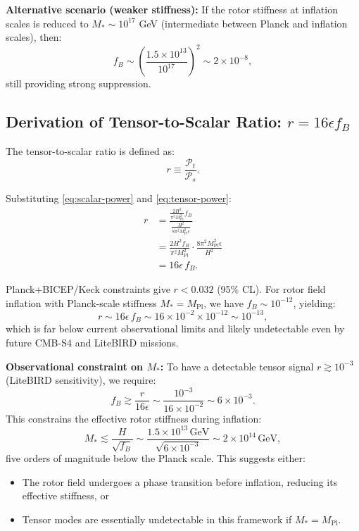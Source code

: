 \documentclass[11pt,a4paper]{article}
\numberwithin{equation}{section}
\theoremstyle{plain}
\theoremstyle{definition}
\theoremstyle{remark}
\begin{document}
\textbf{Alternative scenario (weaker stiffness):} If the rotor stiffness at inflation scales is reduced to $M_* \sim 10^{17}$ GeV (intermediate between Planck and inflation scales), then:
\begin{equation}
f_B \sim \left(\frac{1.5 \times 10^{13}}{10^{17}}\right)^2 \sim 2 \times 10^{-8},
\end{equation}
still providing strong suppression.

\subsection{Derivation of Tensor-to-Scalar Ratio: $r = 16\epsilon f_B$}

The tensor-to-scalar ratio is defined as:
\begin{equation}
r \equiv \frac{\mathcal{P}_t}{\mathcal{P}_s}.
\label{eq:r-def}
\end{equation}

Substituting \eqref{eq:scalar-power} and \eqref{eq:tensor-power}:
\begin{align}
r &= \frac{\frac{2H^2}{\pi^2 M_{\mathrm{Pl}}^2}f_B}{\frac{H^2}{8\pi^2 M_{\mathrm{Pl}}^2\epsilon}}\\
&= \frac{2H^2 f_B}{\pi^2 M_{\mathrm{Pl}}^2}\cdot\frac{8\pi^2 M_{\mathrm{Pl}}^2\epsilon}{H^2}\\
&= 16\epsilon\,f_B.
\label{eq:tensor-to-scalar}
\end{align}

Planck+BICEP/Keck constraints give $r < 0.032$ (95\% CL). For rotor field inflation with Planck-scale stiffness $M_* = M_{\mathrm{Pl}}$, we have $f_B \sim 10^{-12}$, yielding:
\begin{equation}
r \sim 16\epsilon\, f_B \sim 16 \times 10^{-2} \times 10^{-12} \sim 10^{-13},
\end{equation}
which is far below current observational limits and likely undetectable even by future CMB-S4 and LiteBIRD missions.

\textbf{Observational constraint on $M_*$:} To have a detectable tensor signal $r \gtrsim 10^{-3}$ (LiteBIRD sensitivity), we require:
\begin{equation}
f_B \gtrsim \frac{r}{16\epsilon} \sim \frac{10^{-3}}{16 \times 10^{-2}} \sim 6 \times 10^{-3}.
\end{equation}
This constrains the effective rotor stiffness during inflation:
\begin{equation}
M_* \lesssim \frac{H}{\sqrt{f_B}} \sim \frac{1.5 \times 10^{13}\,\text{GeV}}{\sqrt{6 \times 10^{-3}}} \sim 2 \times 10^{14}\,\text{GeV},
\end{equation}
five orders of magnitude below the Planck scale. This suggests either:
\begin{itemize}
  \item The rotor field undergoes a phase transition before inflation, reducing its effective stiffness, or
  \item Tensor modes are essentially undetectable in this framework if $M_* = M_{\mathrm{Pl}}$.
\end{itemize}
\end{document}
